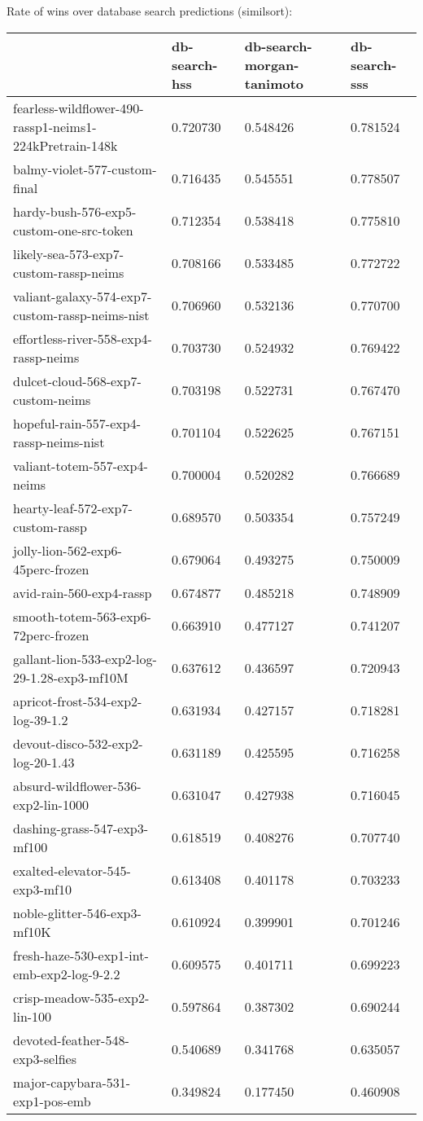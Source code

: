Rate of wins over database search predictions (similsort):
\begin{tabular}{llll}
\toprule
 & db-search-hss & db-search-morgan-tanimoto & db-search-sss \\
\midrule
fearless-wildflower-490-rassp1-neims1-224kPretrain-148k & 0.720730 & 0.548426 & 0.781524 \\
balmy-violet-577-custom-final & 0.716435 & 0.545551 & 0.778507 \\
hardy-bush-576-exp5-custom-one-src-token & 0.712354 & 0.538418 & 0.775810 \\
likely-sea-573-exp7-custom-rassp-neims & 0.708166 & 0.533485 & 0.772722 \\
valiant-galaxy-574-exp7-custom-rassp-neims-nist & 0.706960 & 0.532136 & 0.770700 \\
effortless-river-558-exp4-rassp-neims & 0.703730 & 0.524932 & 0.769422 \\
dulcet-cloud-568-exp7-custom-neims & 0.703198 & 0.522731 & 0.767470 \\
hopeful-rain-557-exp4-rassp-neims-nist & 0.701104 & 0.522625 & 0.767151 \\
valiant-totem-557-exp4-neims & 0.700004 & 0.520282 & 0.766689 \\
hearty-leaf-572-exp7-custom-rassp & 0.689570 & 0.503354 & 0.757249 \\
jolly-lion-562-exp6-45perc-frozen & 0.679064 & 0.493275 & 0.750009 \\
avid-rain-560-exp4-rassp & 0.674877 & 0.485218 & 0.748909 \\
smooth-totem-563-exp6-72perc-frozen & 0.663910 & 0.477127 & 0.741207 \\
gallant-lion-533-exp2-log-29-1.28-exp3-mf10M & 0.637612 & 0.436597 & 0.720943 \\
apricot-frost-534-exp2-log-39-1.2 & 0.631934 & 0.427157 & 0.718281 \\
devout-disco-532-exp2-log-20-1.43 & 0.631189 & 0.425595 & 0.716258 \\
absurd-wildflower-536-exp2-lin-1000 & 0.631047 & 0.427938 & 0.716045 \\
dashing-grass-547-exp3-mf100 & 0.618519 & 0.408276 & 0.707740 \\
exalted-elevator-545-exp3-mf10 & 0.613408 & 0.401178 & 0.703233 \\
noble-glitter-546-exp3-mf10K & 0.610924 & 0.399901 & 0.701246 \\
fresh-haze-530-exp1-int-emb-exp2-log-9-2.2 & 0.609575 & 0.401711 & 0.699223 \\
crisp-meadow-535-exp2-lin-100 & 0.597864 & 0.387302 & 0.690244 \\
devoted-feather-548-exp3-selfies & 0.540689 & 0.341768 & 0.635057 \\
major-capybara-531-exp1-pos-emb & 0.349824 & 0.177450 & 0.460908 \\
\bottomrule
\end{tabular}




